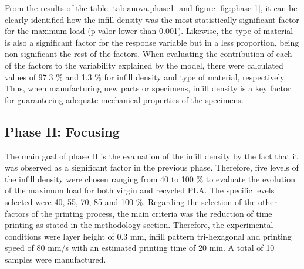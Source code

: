 \documentclass[conference,final,]{IEEEtran}
\begin{document}
\begin{table}

\caption{\label{tab:Table.Anova.fase1}ANOVA results at 95\% significance level}
\centering
{}
\end{table}

From the results of the table \ref{tab:anova.phase1} and figure
\ref{fig:phase-1}, it can be clearly identified how the infill density
was the most statistically significant factor for the maximum load
(p-valor lower than 0.001). Likewise, the type of material is also a
significant factor for the response variable but in a less proportion,
being non-significant the rest of the factors. When evaluating the
contribution of each of the factors to the variability explained by the
model, there were calculated values of 97.3 \% and 1.3 \% for infill
density and type of material, respectively. Thus, when manufacturing new
parts or specimens, infill density is a key factor for guaranteeing
adequate mechanical properties of the specimens.

\hypertarget{phase-ii-focusing}{%
\subsection{Phase II: Focusing}\label{phase-ii-focusing}}

The main goal of phase II is the evaluation of the infill density by the
fact that it was observed as a significant factor in the previous phase.
Therefore, five levels of the infill density were chosen ranging from 40
to 100 \% to evaluate the evolution of the maximum load for both virgin
and recycled PLA. The specific levels selected were 40, 55, 70, 85 and
100 \%. Regarding the selection of the other factors of the printing
process, the main criteria was the reduction of time printing as stated
in the methodology section. Therefore, the experimental conditions were
layer height of 0.3 mm, infill pattern tri-hexagonal and printing speed
of 80 mm/s with an estimated printing time of 20 min. A total of 10
samples were manufactured.
\end{document}
